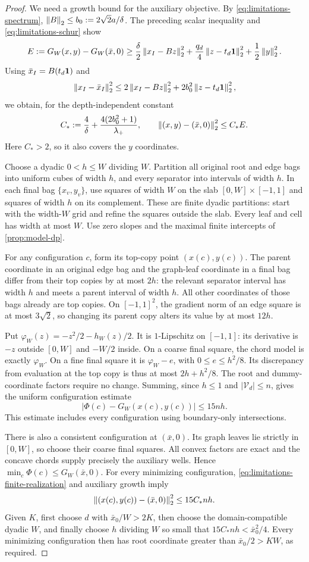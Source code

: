 \begin{proof}
We need a growth bound for the auxiliary objective. By
\cref{eq:limitations-spectrum},
$\left\lVert B\right\rVert_2\le b_0:=2\sqrt2a/\delta$.
The preceding scalar inequality and \cref{eq:limitations-schur} show
\[
 E:=G_W(x,y)-G_W(\bar x,0)
 \ge\frac\delta2\left\lVert x_I-Bz\right\rVert_2^2
       +\frac{q_d}4\left\lVert z-t_d\mathbf 1\right\rVert_2^2+\frac12\left\lVert y\right\rVert_2^2.
\]
Using $\bar x_I=B(t_d\mathbf 1)$ and
\[
 \left\lVert x_I-\bar x_I\right\rVert_2^2
 \le2\left\lVert x_I-Bz\right\rVert_2^2+2b_0^2\left\lVert z-t_d\mathbf 1\right\rVert_2^2,
\]
we obtain, for the depth-independent constant
\[
 C_*:=\frac4\delta+\frac{4(2b_0^2+1)}{\lambda_+},
 \qquad
 \left\lVert (x,y)-(\bar x,0)\right\rVert_2^2\le C_*E.
\]
Here $C_*>2$, so it also covers the $y$ coordinates.

Choose a dyadic $0<h\le W$ dividing $W$. Partition all original root
and edge bags into uniform cubes of width $h$, and every separator into
intervals of width $h$. In each final bag $\{x_v,y_v\}$, use squares of
width $W$ on the slab $[0,W]\times[-1,1]$ and squares of width $h$ on
its complement. These are finite dyadic partitions: start with the
width-$W$ grid and refine the squares outside the slab. Every leaf and
cell has width at most $W$. Use zero slopes and the maximal finite
intercepts of \cref{prop:model-dp}.

For any configuration $c$, form its top-copy point $(x(c),y(c))$.
The parent coordinate in an original edge bag and the graph-leaf
coordinate in a final bag differ from their top copies by at most $2h$:
the relevant separator interval has width $h$ and meets a parent
interval of width $h$. All other coordinates of those bags already
are top copies. On $[-1,1]^2$, the gradient norm of an edge square is
at most $3\sqrt2$, so changing its parent copy alters its value by
at most $12h$.

Put $\varphi_W(z)=-z^2/2-h_W(z)/2$. It is $1$-Lipschitz on
$[-1,1]$: its derivative is $-z$ outside $[0,W]$ and $-W/2$ inside.
On a coarse final square, the chord model is exactly $\varphi_W$.
On a fine final square it is $\varphi_W-e$, with $0\le e\le h^2/8$.
Its discrepancy from evaluation at the top copy is thus at most
$2h+h^2/8$. The root and dummy-coordinate factors require no change.
Summing, since $h\le1$ and $|\mathcal V_d|\le n$, gives the uniform
configuration estimate
\begin{equation}\label{eq:limitations-finite-realization}
 \bigl|\Phi(c)-G_W(x(c),y(c))\bigr|\le15nh.
\end{equation}
This estimate includes every configuration using boundary-only
intersections.

There is also a consistent configuration at $(\bar x,0)$. Its graph
leaves lie strictly in $[0,W]$, so choose their coarse final squares.
All convex factors are exact and the concave chords supply precisely
the auxiliary wells. Hence $\min_c\Phi(c)\le G_W(\bar x,0)$.
For every minimizing configuration, \cref{eq:limitations-finite-realization}
and auxiliary growth imply
\[
 \left\lVert (x(c),y(c))-(\bar x,0)\right\rVert_2^2\le15C_*nh.
\]
Given $K$, first choose $d$ with $\bar x_0/W>2K$, then choose the
domain-compatible dyadic $W$, and finally choose $h$ dividing $W$ so
small that $15C_*nh<\bar x_0^2/4$. Every minimizing configuration then
has root coordinate greater than $\bar x_0/2>KW$, as required.
\end{proof}

